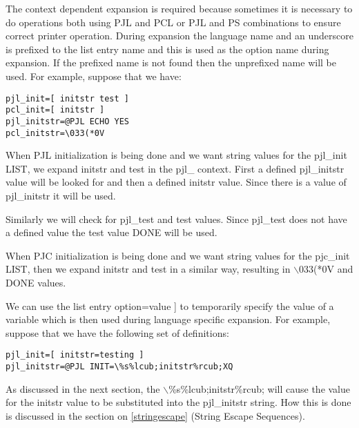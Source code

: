 \documentclass[a4paper]{article}
\begin{document}
The context dependent expansion is required because sometimes it
is necessary to do operations both using PJL and PCL or PJL and PS
combinations to ensure correct printer operation.
During expansion the language name and an underscore
is prefixed to the list entry name and this is used as the option name during expansion.
If the prefixed name is not found then the unprefixed name will be used.
For example,  suppose that we have:
\begin{tscreen}
\begin{verbatim}
pjl_init=[ initstr test ]
pcl_init=[ initstr ]
pjl_initstr=@PJL ECHO YES
pcl_initstr=\033(*0V
\end{verbatim}
\end{tscreen}


When PJL initialization is being done and we want string values
for the {\ttfamily pjl\_init} LIST, we expand  {\ttfamily initstr} and {\ttfamily test}
in the {\ttfamily pjl\_} context.
First a defined {\ttfamily pjl\_initstr} value will be looked for and then
a defined {\ttfamily initstr} value.
Since there is a value of {\ttfamily pjl\_initstr} it will be used.

Similarly we will check for {\ttfamily pjl\_test} and {\ttfamily test} values.
Since {\ttfamily pjl\_test} does not have a defined value
the {\ttfamily test} value {\ttfamily DONE} will be used.

When PJC initialization is being done and we want string values
for the {\ttfamily pjc\_init} LIST, then we expand  {\ttfamily initstr} and {\ttfamily test}
in a similar way, resulting in {\ttfamily $\backslash$033(*0V} and {\ttfamily DONE} values.

We can use the list entry
{\ttfamily {[} option=value {]}}
to temporarily specify the value of a variable
which is then used during language specific expansion.
For example,
suppose that we have the following set of definitions:
\begin{tscreen}
\begin{verbatim}
pjl_init=[ initstr=testing ]
pjl_initstr=@PJL INIT=\%s%lcub;initstr%rcub;XQ
\end{verbatim}
\end{tscreen}


As discussed in the next section,
the {\ttfamily $\backslash$\%s\%lcub;initstr\%rcub;} will cause the value for the {\ttfamily initstr} value to
be substituted into the {\ttfamily pjl\_initstr} string.
How this is done is discussed in the section on
\ref{stringescape} {(String Escape Sequences)}.
\end{document}
